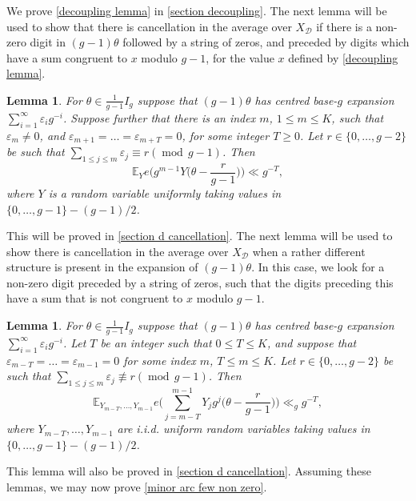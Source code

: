\documentclass[hidelinks,11pt,reqno]{amsart}
\renewcommand{\leq}{\leqslant}
\renewcommand{\geq}{\geqslant}
\newcommand{\E}{\ensuremath{\mathbb{E}}}
\newcommand{\xbd}{X_{\mathcal{D}}}
\newcommand{\nequiv}{\not\equiv}
\newtheorem{lemma}[prop]{Lemma}
\theoremstyle{remark}
\newcommand{\md}[1]{\ensuremath{(\operatorname{mod}\, #1)}}
\begin{document}
We prove \cref{decoupling lemma} in \cref{section decoupling}. The next lemma will be used to show that there is cancellation in the average over $\xbd$ if there is a non-zero digit in $(g-1)\theta$ followed by a string of zeros, and preceded by digits which have a sum congruent to $x$ modulo $g-1$, for the value $x$ defined by \cref{decoupling lemma}. 
\begin{lemma}\label{post cancellation} For $\theta\in \tfrac{1}{g-1}I_{g}$ suppose that $(g-1)\theta$ has centred base-$g$ expansion $\sum_{i=1}^{\infty}\varepsilon_{i}g^{-i}$. Suppose further that there is an index $m$, $1\leq m\leq K$, such that $\varepsilon_{m}\neq 0$, and $\varepsilon_{m+1}=\ldots= \varepsilon_{m+T}=0$, for some integer $T\geq 0$. Let $r\in \{0,\ldots, g-2\}$ be such that $\sum_{1\leq j \leq m}\varepsilon_{j}\equiv r\md{g-1}$. Then \[\E_{Y}e\Big(g^{m-1}Y\Big (\theta-\frac{r}{g-1}\Big)\Big)\ll g^{-T},\]
       where $Y$ is a random variable uniformly taking values in $\{0,\ldots, g-1\}-(g-1)/2$.
\end{lemma}
This will be proved in \cref{section d cancellation}. The next lemma will be used to show there is cancellation in the average over $\xbd$ when a rather different structure is present in the expansion of $(g-1)\theta$. In this case, we look for a non-zero digit preceded by a string of zeros, such that the digits preceding this have a sum that is not congruent to $x$ modulo $g-1$.  
\begin{lemma}\label{pre block cancellation}
For $\theta\in \tfrac{1}{g-1}I_{g}$ suppose that $(g-1)\theta$ has centred base-$g$ expansion $\sum_{i=1}^{\infty}\varepsilon_{i}g^{-i}$. Let $T$ be an integer such that $0\leq T\leq K$, and suppose that $\varepsilon_{m-T}=\ldots=\varepsilon_{m-1}=0$ for some index $m$, $T\leq m\leq K$. Let $r\in \{0,\ldots, g-2\}$ be such that $\sum_{1\leq j \leq m}\varepsilon_{j}\nequiv r\md{g-1}$. Then
\[\E_{Y_{m-T},\ldots, Y_{m-1}}e\Big (\sum_{j=m-T}^{m-1}Y_{j}g^{j}\Big(\theta-\frac{r}{g-1}\Big)\Big)\ll_{g} g^{-T},\]
where $Y_{m-T},\ldots, Y_{m-1}$ are i.i.d. uniform random variables taking values in $\{0,\ldots, g-1\}-(g-1)/2$.
\end{lemma}
This lemma will also be proved in \cref{section d cancellation}. Assuming these lemmas, we may now prove \cref{minor arc few non zero}.
\end{document}
